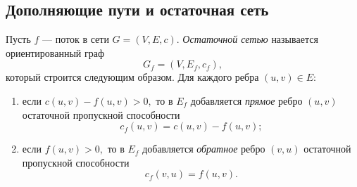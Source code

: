 \subsection{Дополняющие пути и остаточная сеть}

\begin{Definition}{}{}
	Пусть $f$ --- поток в сети $G=(V,E,c)$. \emph{Остаточной сетью} называется ориентированный граф
	\[
	G_f=(V,E_f,c_f),
	\]
	который строится следующим образом. Для каждого ребра $(u,v)\in E$:
	\begin{enumerate}[label=\arabic*)]
		\item если $c(u,v)-f(u,v)>0,$ то в $E_f$ добавляется \emph{прямое} ребро $(u,v)$ остаточной пропускной способности
		\[
		c_f(u,v)=c(u,v)-f(u,v);
		\]
		\item если $f(u,v)>0,$ то в $E_f$ добавляется \emph{обратное} ребро $(v,u)$ остаточной пропускной способности
		\[
		c_f(v,u)=f(u,v).
		\]
	\end{enumerate}
\end{Definition}

